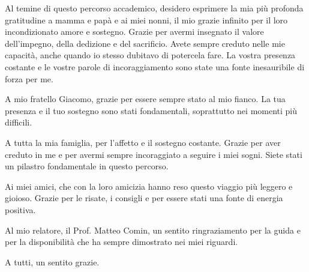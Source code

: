 Al temine di questo percorso accademico, desidero esprimere la mia più profonda gratitudine a mamma e papà e ai miei nonni, il mio grazie infinito per il loro incondizionato amore e sostegno. Grazie per avermi insegnato il valore dell'impegno, della dedizione e del sacrificio. Avete sempre creduto nelle mie capacità, anche quando io stesso dubitavo di potercela fare. La vostra presenza costante e le vostre parole di incoraggiamento sono state una fonte inesauribile di forza per me.

A mio fratello Giacomo, grazie per essere sempre stato al mio fianco. La tua presenza e il tuo sostegno sono stati fondamentali, soprattutto nei momenti più difficili.

A tutta la mia famiglia, per l'affetto e il sostegno costante. Grazie per aver creduto in me e per avermi sempre incoraggiato a seguire i miei sogni. Siete stati un pilastro fondamentale in questo percorso.

Ai miei amici, che con la loro amicizia hanno reso questo viaggio più leggero e gioioso. Grazie per le risate, i consigli e per essere stati una fonte di energia positiva.

Al mio relatore, il Prof. Matteo Comin, un sentito ringraziamento per la guida e per la disponibilità che ha sempre dimostrato nei miei riguardi.\bigskip


A tutti, un sentito grazie.
